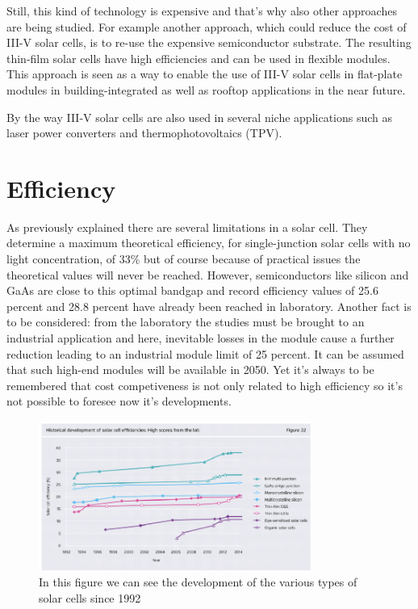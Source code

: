 \documentclass[11pt]{article} %
\begin{document}
Still, this kind of technology is expensive and that’s why also other approaches are being studied. For example another  approach, which  could  reduce  the cost  of  III-V  solar  cells,  is  to re-use  the  expensive semiconductor substrate. The resulting thin-film solar cells have high efficiencies and can be used in flexible modules. This approach is  seen  as  a  way  to  enable  the  use  of  III-V  solar  cells  in  flat-plate modules in building-integrated as well as rooftop applications in the near future. 

 By the way III-V solar cells are also used in several niche applications such as laser power converters and thermophotovoltaics (TPV).
 
 \section{Efficiency}
As previously explained there are several limitations in a solar cell. They determine a maximum theoretical efficiency, for single-junction solar cells with no light concentration, of 33\% but of course because of practical issues the theoretical values will never be reached. However, semiconductors like silicon and GaAs are close to this optimal bandgap and record efficiency values of 25.6 percent and 28.8 percent have already been reached in laboratory. Another fact is to be considered: from the laboratory the studies must be brought to an industrial application and here, inevitable losses in the module cause a further reduction leading to an industrial module limit of 25 percent. It can be assumed that such high-end modules will be available in 2050. Yet it’s always to be remembered that cost competiveness is not only related to high efficiency so it’s not possible to foresee now it’s developments. 

\begin{figure}[h]
	\centering
	\includegraphics[width=0.8\textwidth]{img/Immagine.png}
	\caption{In this figure we can see the development of the various types of solar cells since 1992}
\end{figure}
\end{document}
